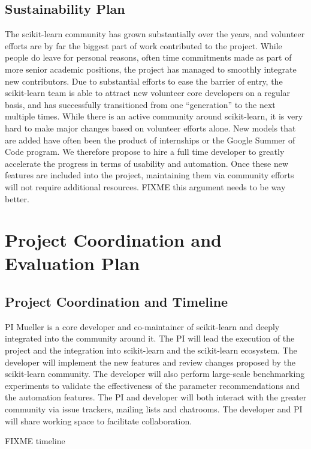 \subsection{Sustainability Plan}
The scikit-learn community has grown substantially over the years, and volunteer efforts
are by far the biggest part of work contributed to the project.
While people do leave for personal reasons, often time commitments made as part
of more senior academic positions, the project has managed to smoothly integrate new
contributors. Due to substantial efforts to ease the barrier of entry, the scikit-learn
team is able to attract new volunteer core developers on a regular basis, and has
successfully transitioned from one ``generation'' to the next multiple times.
While there is an active community around scikit-learn, it is very hard to make
major changes based on volunteer efforts alone. New models that are added have often
been the product of internships or the Google Summer of Code program.
We therefore propose to hire a full time developer to greatly accelerate the progress
in terms of usability and automation.
Once these new features are included into the project, maintaining them via community
efforts will not require additional resources. FIXME this argument needs to be way better.


\section{Project Coordination and Evaluation Plan}
\subsection{Project Coordination and Timeline}
PI Mueller is a core developer and co-maintainer of scikit-learn and deeply integrated
into the community around it. The PI will lead the execution of the project and the integration
into scikit-learn and the scikit-learn ecosystem.
The developer will implement the new features and review changes proposed by
the scikit-learn community. The developer will also perform large-scale
benchmarking experiments to validate the effectiveness of the parameter
recommendations and the automation features.  The PI and developer will both
interact with the greater community via issue trackers, mailing lists and
chatrooms. The developer and PI will share working space to facilitate
collaboration.

FIXME timeline

